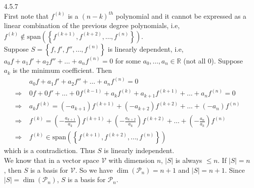 \documentclass{article}
\theoremstyle{definition}
\begin{document}
	\begin{prob}{4.5.7} $  $ \vspace{2mm} \\
		First note that $ f^{(k)} $ is a $ (n-k)^{th} $ polynomial and it cannot be expressed as a linear combination of the previous degree polynomials, i.e, $ f^{(k)} \notin \text{span}\left( \left\{ f^{(k+1)}, f^{(k+2)}, \dots, f^{(n)} \right\} \right) $. \\
		
		Suppose $ S = \left\{ f, f', f'', \dots, f^{(n)} \right\} $ is linearly dependent, i.e, $ a_0f + a_1f' + a_2f'' + \dots + a_n f^{(n)} = 0 $ for some $ a_0, \dots, a_n \in \mathbb{R} $ (not all 0). Suppose $ a_k $ is the minimum coefficient. Then
			\begin{align*}
				&a_0f + a_1f' + a_2f'' + \dots + a_nf^{(n)} = 0 \\
				\Rightarrow \; &0f + 0f' + \dots + 0f^{(k-1)} + a_k f^{(k)} + a_{k+1} f^{(k+1)} + \dots + a_n f^{(n)} = 0 \\
				\Rightarrow \; & a_k f^{(k)} = (-a_{k+1}) f^{(k+1)} + (-a_{k+2})f^{(k+2)} + \dots + (-a_n) f^{(n)} \\
				\Rightarrow \; & f^{(k)} = \left( -\frac{a_{k+1}}{a_k} \right) f^{(k+1)} + \left( -\frac{a_{k+2}}{a_k} \right) f^{(k+2)} + \dots + \left( -\frac{a_n}{a_k} \right) f^{(n)} \\
				\Rightarrow \; & f^{(k)} \in \text{span}\left( \left\{ f^{(k+1)}, f^{(k+2)}, \dots, f^{(n)} \right\} \right)
			\end{align*}
			which is a contradiction. Thus $ S $ is linearly independent. \\
			
			We know that in a vector space $ \mathcal{V} $ with dimension $ n $, $ |S| $ is always $\leq n $. If $ |S| = n $, then $ S $ is a basis for $ \mathcal{V} $. So we have $ \dim(\mathcal{P}_n) = n+1 $ and $ |S| = n+1 $. Since $ |S| = \dim(\mathcal{P}_n) $, $ S $ is a basis for $ \mathcal{P}_n $. \\
	\end{prob}
\end{document}
